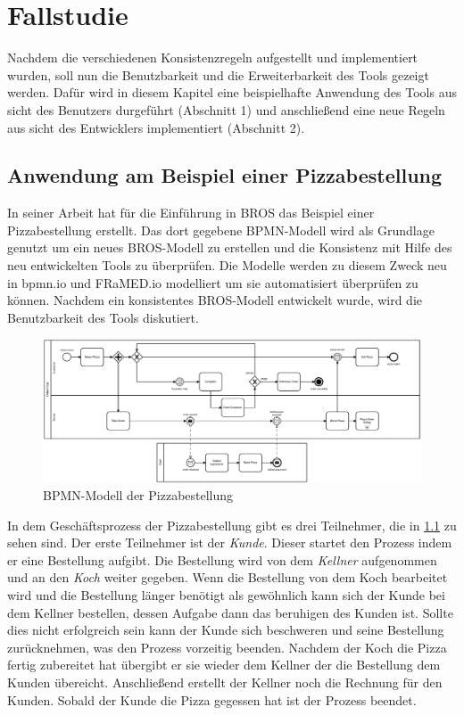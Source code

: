 \chapter{Fallstudie}
\label{chap:evaluation}

Nachdem die verschiedenen Konsistenzregeln aufgestellt und implementiert wurden, soll nun die Benutzbarkeit und die Erweiterbarkeit des Tools gezeigt werden.
Dafür wird in diesem Kapitel eine beispielhafte Anwendung des Tools aus sicht des Benutzers durgeführt (Abschnitt 1) und anschließend eine neue Regeln aus sicht des Entwicklers implementiert (Abschnitt 2).

\section{Anwendung am Beispiel einer Pizzabestellung}

In seiner Arbeit hat \cite{Schoen} für die Einführung in BROS das Beispiel einer Pizzabestellung erstellt.
Das dort gegebene BPMN-Modell wird als Grundlage genutzt um ein neues BROS-Modell zu erstellen und die Konsistenz mit Hilfe des neu entwickelten Tools zu überprüfen.
Die Modelle werden zu diesem Zweck neu in bpmn.io und FRaMED.io modelliert um sie automatisiert überprüfen zu können.
Nachdem ein konsistentes BROS-Modell entwickelt wurde, wird die Benutzbarkeit des Tools diskutiert.

\begin{figure}
    \centering
    \includegraphics[width=\textwidth,keepaspectratio]{../images/example/bpmn.pdf}%
    \caption{BPMN-Modell der Pizzabestellung}%
    \label{fig:pizzaBpmn}
\end{figure}

In dem Geschäftsprozess der Pizzabestellung gibt es drei Teilnehmer, die in \cref{fig:pizzaBpmn} zu sehen sind.
Der erste Teilnehmer ist der  \emph{Kunde}.
Dieser startet den Prozess indem er eine Bestellung aufgibt.
Die Bestellung wird von dem \emph{Kellner} aufgenommen und an den \emph{Koch} weiter gegeben.
Wenn die Bestellung von dem Koch bearbeitet wird und die Bestellung länger benötigt als gewöhnlich kann sich der Kunde bei dem Kellner bestellen, dessen Aufgabe dann das beruhigen des Kunden ist.
Sollte dies nicht erfolgreich sein kann der Kunde sich beschweren und seine Bestellung zurücknehmen, was den Prozess vorzeitig beenden.
Nachdem der Koch die Pizza fertig zubereitet hat übergibt er sie wieder dem Kellner der die Bestellung dem Kunden übereicht.
Anschließend erstellt der Kellner noch die Rechnung für den Kunden.
Sobald der Kunde die Pizza gegessen hat ist der Prozess beendet.

